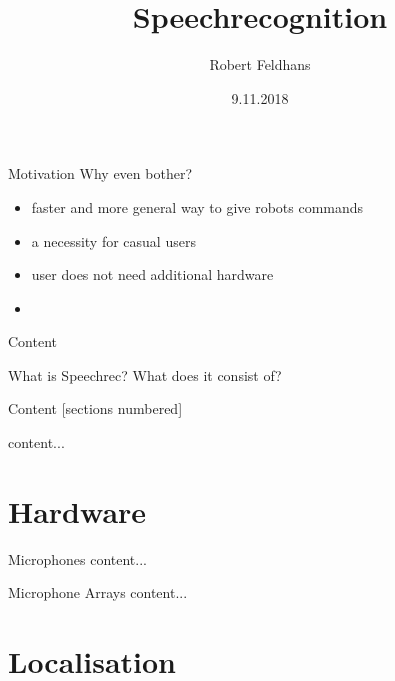 \documentclass{beamer}
\title{Speechrecognition}
\date{9.11.2018}
\author{Robert Feldhans}
\institute{Seminar Robocup}
\begin{document}
	\maketitle
	
	\begin{frame}{Motivation}
		Why even bother?
		\begin{itemize}
			\item faster and more general way to give robots commands
			\item a necessity for casual users
			\item user does not need additional hardware
			\item 
		\end{itemize}
	\end{frame}
	
	\begin{frame}{Content}
		
		\begin{alertblock}{What is Speechrec? What does it consist of?}
		\end{alertblock}
		
	\end{frame}
	
	\begin{frame}{Content}
		[sections numbered]
		\tableofcontents[hideallsubsections]
	\end{frame}
	
	\begin{frame}{}
		content...
	\end{frame}
	
	
	\section{Hardware}%
	
	\begin{frame}{Microphones}
		content...
	\end{frame}
	
	\begin{frame}{Microphone Arrays}
		content...
	\end{frame}
	
	\section{Localisation}%
	
\end{document}
